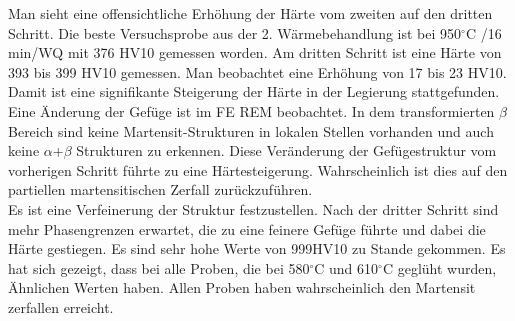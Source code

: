 Man sieht eine offensichtliche Erhöhung der Härte vom zweiten auf den dritten Schritt. Die beste Versuchsprobe aus der 2. Wärmebehandlung ist bei 950$^\circ$C /16 min/WQ mit 376 HV10 gemessen worden. Am dritten Schritt ist eine Härte von 393 bis 399 HV10 gemessen. Man beobachtet eine Erhöhung von 17 bis 23 HV10. Damit ist eine signifikante Steigerung der Härte in der Legierung stattgefunden. Eine Änderung der Gefüge ist im FE REM beobachtet. In dem transformierten $\beta$ Bereich sind keine Martensit-Strukturen in lokalen Stellen vorhanden und auch keine $\alpha$+$\beta$ Strukturen zu erkennen. Diese Veränderung der Gefügestruktur vom vorherigen Schritt führte zu eine Härtesteigerung. Wahrscheinlich ist dies auf den partiellen martensitischen Zerfall zurückzuführen.
\\Es ist eine Verfeinerung der Struktur festzustellen. Nach der dritter Schritt sind mehr Phasengrenzen erwartet, die zu eine feinere Gefüge führte und dabei die Härte gestiegen. Es sind sehr hohe Werte von 999HV10 zu Stande gekommen. Es hat sich gezeigt, dass bei alle Proben, die bei 580$^\circ$C und 610$^\circ$C geglüht wurden, Ähnlichen Werten haben. Allen Proben haben wahrscheinlich den Martensit zerfallen erreicht.
